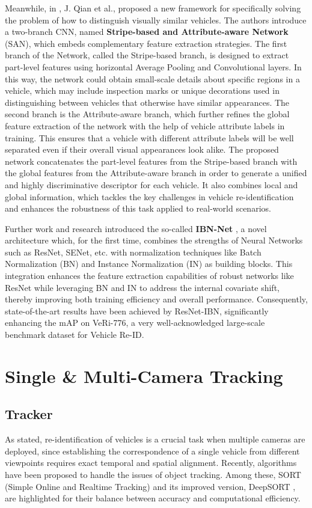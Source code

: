 Meanwhile, in \cite{VehicleReID_2}, J. Qian et al., proposed a new framework for specifically solving the problem of how to distinguish visually similar vehicles. The authors introduce a two-branch CNN, named \textbf{Stripe-based and Attribute-aware Network} (SAN), which embeds complementary feature extraction strategies. The first branch of the Network, called the Stripe-based branch, is designed to extract part-level features using horizontal Average Pooling and Convolutional layers. In this way, the network could obtain small-scale details about specific regions in a vehicle, which may include inspection marks or unique decorations used in distinguishing between vehicles that otherwise have similar appearances.
The second branch is the Attribute-aware branch, which further refines the global feature extraction of the network with the help of vehicle attribute labels in training. This ensures that a vehicle with different attribute labels will be well separated even if their overall visual appearances look alike.
The proposed network concatenates the part-level features from the Stripe-based branch with the global features from the Attribute-aware branch in order to generate a unified and highly discriminative descriptor for each vehicle. It also combines local and global information, which tackles the key challenges in vehicle re-identification and enhances the robustness of this task applied to real-world scenarios.

Further work and research introduced the so-called \textbf{IBN-Net} \cite{IBN-Net}, a novel architecture which, for the first time, combines the strengths of Neural Networks such as ResNet, SENet, etc. with normalization techniques like Batch Normalization (BN) and Instance Normalization (IN) as building blocks. This integration enhances the feature extraction capabilities of robust networks like ResNet while leveraging BN and IN to address the internal covariate shift, thereby improving both training efficiency and overall performance. Consequently, state-of-the-art results have been achieved by ResNet-IBN, significantly enhancing the mAP on VeRi-776, a very well-acknowledged large-scale benchmark dataset for Vehicle Re-ID.

\section{Single \& Multi-Camera Tracking}

\subsection{Tracker}
As stated, re-identification of vehicles is a crucial task when multiple cameras are deployed, since establishing the correspondence of a single vehicle from different viewpoints requires exact temporal and spatial alignment. Recently, algorithms have been proposed to handle the issues of object tracking. Among these, SORT (Simple Online and Realtime Tracking) \cite{SORT} and its improved version, DeepSORT \cite{DeepSORT}, are highlighted for their balance between accuracy and computational efficiency.

